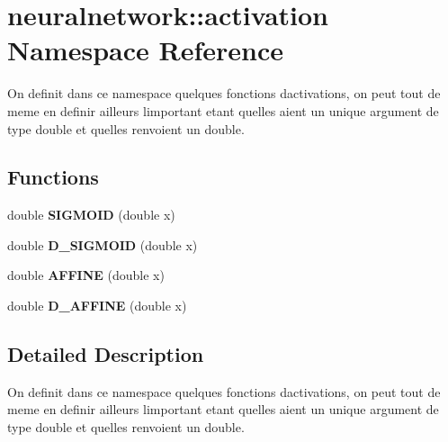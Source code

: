 \hypertarget{namespaceneuralnetwork_1_1activation}{}\section{neuralnetwork\+:\+:activation Namespace Reference}
\label{namespaceneuralnetwork_1_1activation}


On definit dans ce namespace quelques fonctions d\textquotesingle{}activations, on peut tout de meme en definir ailleurs l\textquotesingle{}important etant qu\textquotesingle{}elles aient un unique argument de type double et qu\textquotesingle{}elles renvoient un double.  


\subsection*{Functions}
\begin{DoxyCompactItemize}
\item 
\mbox{\label{namespaceneuralnetwork_1_1activation_af73eebb32dbf811448d273c7b8b4f1b9}} 
double {\bfseries S\+I\+G\+M\+O\+ID} (double x)
\item 
\mbox{\label{namespaceneuralnetwork_1_1activation_a6bca45628316235d5245ec9634c86be3}} 
double {\bfseries D\+\_\+\+S\+I\+G\+M\+O\+ID} (double x)
\item 
\mbox{\label{namespaceneuralnetwork_1_1activation_a9b2c20fee30eb74259d6f5f33bebad61}} 
double {\bfseries A\+F\+F\+I\+NE} (double x)
\item 
\mbox{\label{namespaceneuralnetwork_1_1activation_a8279fd8440c306255ffaf31a700fab76}} 
double {\bfseries D\+\_\+\+A\+F\+F\+I\+NE} (double x)
\end{DoxyCompactItemize}


\subsection{Detailed Description}
On definit dans ce namespace quelques fonctions d\textquotesingle{}activations, on peut tout de meme en definir ailleurs l\textquotesingle{}important etant qu\textquotesingle{}elles aient un unique argument de type double et qu\textquotesingle{}elles renvoient un double. 